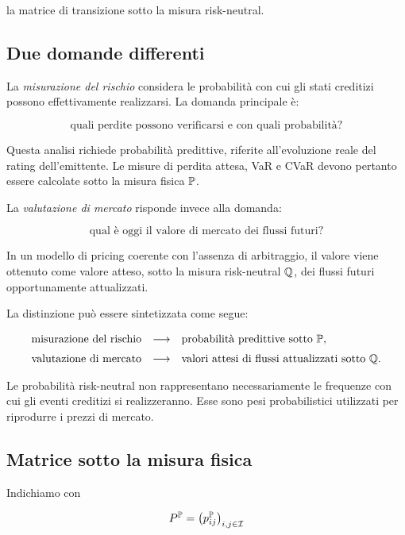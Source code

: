 la matrice di transizione sotto la misura risk-neutral.

\subsection{Due domande differenti}

\label{subsec:cap9-due-domande}

La \emph{misurazione del rischio} considera le probabilit\`{a} con cui
gli stati creditizi possono effettivamente realizzarsi. La domanda
principale \`{e}:

\[
\text{quali perdite possono verificarsi e con quali probabilit\`{a}?}
\]

Questa analisi richiede probabilit\`{a} predittive, riferite
all'evoluzione reale del rating dell'emittente. Le misure di perdita
attesa, VaR e CVaR devono pertanto essere calcolate sotto la misura
fisica $\mathbb{P}$.

La \emph{valutazione di mercato} risponde invece alla domanda:

\[
\text{qual \`{e} oggi il valore di mercato dei flussi futuri?}
\]

In un modello di pricing coerente con l'assenza di arbitraggio, il
valore viene ottenuto come valore atteso, sotto la misura
risk-neutral $\mathbb{Q}$, dei flussi futuri opportunamente attualizzati.

La distinzione pu\`{o} essere sintetizzata come segue:

\[
\begin{array}{ccl}
\text{misurazione del rischio}
&
\longrightarrow
&
\text{probabilit\`{a} predittive sotto }\mathbb{P},
\\[2mm]
\text{valutazione di mercato}
&
\longrightarrow
&
\text{valori attesi di flussi attualizzati sotto }\mathbb{Q}.
\end{array}
\]

Le probabilit\`{a} risk-neutral non rappresentano necessariamente le
frequenze con cui gli eventi creditizi si realizzeranno. Esse sono
pesi probabilistici utilizzati per riprodurre i prezzi di mercato.

\subsection{Matrice sotto la misura fisica}

\label{subsec:cap9-matrice-fisica}

Indichiamo con

\[
P^{\mathbb{P}}
=
\left(
p_{ij}^{\mathbb{P}}
\right)_{i,j\in\mathcal{I}}
\]

